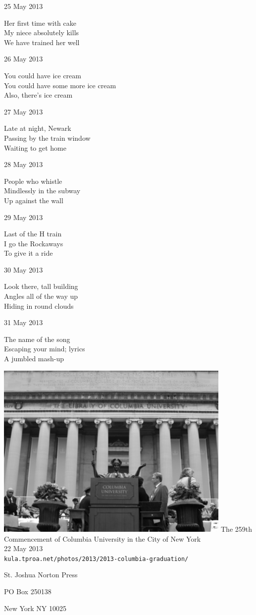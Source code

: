 \documentclass[12pt]{article}
\begin{document}
\newpage

25 May 2013

Her first time with cake \\
My niece absolutely kills \\
We have trained her well

26 May 2013

You could have ice cream \\
You could have some more ice cream \\
Also, there's ice cream

27 May 2013

Late at night, Newark \\
Passing by the train window \\
Waiting to get home

28 May 2013

People who whistle \\
Mindlessly in the subway \\
Up against the wall

29 May 2013

Last of the H train \\
I go the Rockaways \\
To give it a ride

30 May 2013

Look there, tall building \\
Angles all of the way up \\
Hiding in round clouds

31 May 2013

The name of the song \\
Escaping your mind; lyrics \\
A jumbled mash-up


\newpage

\begin{center}
\includegraphics[width=325pt]{columbia.png}
The 259th Commencement of Columbia University in the City of New York \\
22 May 2013 \\
{\tt kula.tproa.net/photos/2013/2013-columbia-graduation/}
\end{center}

\newpage

\thispagestyle{empty}
\vspace*{12cm}
\begin{sideways}
\Large{St. Joshua Norton Press}
\end{sideways}
\begin{sideways}
\Large{PO Box 250138}
\end{sideways}
\begin{sideways}
\Large{New York NY 10025}
\end{sideways}
\end{document}
